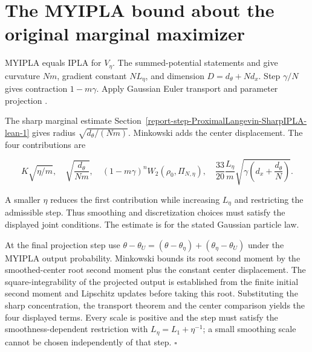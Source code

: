 \documentclass[11pt,a4paper]{report}
\begin{document}
\section{\texorpdfstring{The MYIPLA bound about the original marginal maximizer}{The MYIPLA bound about the original marginal maximizer}}



MYIPLA equals IPLA for \(V_\eta\). The summed-potential statements \cite[Section~3.1.3]{LangevinLean2026IPLA} and \cite[Section~3.1.4]{LangevinLean2026IPLA} give curvature \(Nm\), gradient constant \(NL_\eta\), and dimension \(D=d_\theta+Nd_x\). Step \(\gamma/N\) gives contraction \(1-m\gamma\). Apply Gaussian Euler transport \cite[Section~3.45.7]{LangevinLean2026ULASC} and parameter projection \cite[Section~3.48.9]{LangevinLean2026ULASC}.



The sharp marginal estimate Section~\ref{report-step-ProximalLangevin-SharpIPLA-lean-1} gives radius \(\sqrt{d_\theta/(Nm)}\). Minkowski adds the center displacement. The four contributions are

\[K\sqrt{\eta/m},\quad\sqrt{\frac{d_\theta}{Nm}},\quad
(1-m\gamma)^nW_2(\rho_0,\Pi_{N,\eta}),\quad
\frac{33}{20}\frac{L_\eta}{m}\sqrt{\gamma\left(d_x+\frac{d_\theta}{N}\right)}.\]

A smaller \(\eta\) reduces the first contribution while increasing \(L_\eta\) and restricting the admissible step. Thus smoothing and discretization choices must satisfy the displayed joint conditions. The estimate is for the stated Gaussian particle law.




At the final projection step use \(\theta-\theta_U=(\theta-\theta_\eta)+(\theta_\eta-\theta_U)\) under the MYIPLA output probability. Minkowski bounds its root second moment by the smoothed-center root second moment plus the constant center displacement. The square-integrability of the projected output is established from the finite initial second moment and Lipschitz updates before taking this root. Substituting the sharp concentration, the transport theorem and the center comparison yields the four displayed terms. Every scale is positive and the step must satisfy the smoothness-dependent restriction with \(L_\eta=L_1+\eta^{-1}\); a small smoothing scale cannot be chosen independently of that step. \(\square\)
\end{document}
